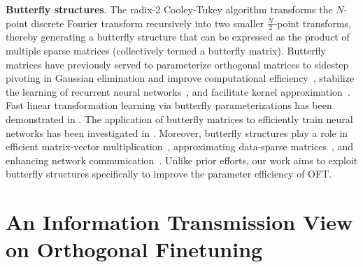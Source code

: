 \textbf{Butterfly structures}. The radix-2 Cooley-Tukey algorithm transforms the $N$-point discrete Fourier transform recursively into two smaller $\frac{N}{2}$-point transforms, thereby generating a butterfly structure that can be expressed as the product of multiple sparse matrices (collectively termed a butterfly matrix). Butterfly matrices have previously served to parameterize orthogonal matrices to sidestep pivoting in Gaussian elimination and improve computational efficiency~\cite{parker1995random}, stabilize the learning of recurrent neural networks~\cite{jing2017tunable}, and facilitate kernel approximation~\cite{munkhoeva2018quadrature}. Fast linear transformation learning via butterfly parameterizations has been demonstrated in \cite{dao2019learning,dao2019kaleidoscope}. The application of butterfly matrices to efficiently train neural networks has been investigated in \cite{chen2022pixelated,dao2022monarch}. Moreover, butterfly structures play a role in efficient matrix-vector multiplication~\cite{michielssen1996multilevel,o2010algorithm}, approximating data-sparse matrices~\cite{li2015butterfly}, and enhancing network communication~\cite{klasing1994broadcasting,li2003linear,rajasingh2016transmission}. Unlike prior efforts, our work aims to exploit butterfly structures specifically to improve the parameter efficiency of OFT.

\section{An Information Transmission View on Orthogonal Finetuning}

